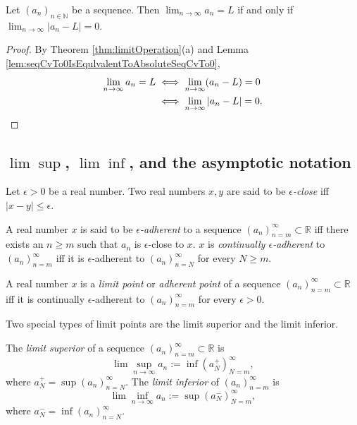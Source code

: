 \begin{coro}
  \label{coro:seqToLIsEquvalentToAbsOfSeqMinusLTo0}
  Let $(a_{n})_{n\in \mathbb{N}}$ be a sequence. Then
  $\lim_{n\rightarrow\infty}a_{n}=L$ if and only if
  $\lim_{n\rightarrow\infty}|a_{n}-L|=0$.
\end{coro}
\begin{proof}
  By Theorem \ref{thm:limitOperation}(a) and Lemma
  \ref{lem:seqCvTo0IsEqulvalentToAbsoluteSeqCvTo0},
  \begin{align*}
    \lim_{n\rightarrow\infty}a_{n}=L
    &\iff
      \lim_{n\rightarrow\infty}(a_{n}-L)=0\\
    &\iff
      \lim_{n\rightarrow\infty}|a_{n}-L|=0.\qedhere
  \end{align*}
\end{proof}

\subsection{$\lim\sup$, $\lim\inf$, and
  the asymptotic notation}
\label{sec:limSupLimInfAsympNotatation}


\begin{defn}
  Let $\epsilon>0$ be a real number.
  Two real numbers $x,y$ are said to be \emph{$\epsilon$-close}
  iff $|x-y|\le \epsilon$.
\end{defn}

\begin{defn}
  A real number $x$ is said to be \emph{$\epsilon$-adherent}
  to a sequence $(a_n)_{n=m}^{\infty}\subset \mathbb{R}$
  iff there exists an $n\ge m$ such that
  $a_n$ is $\epsilon$-close to $x$.
  $x$ is \emph{continually $\epsilon$-adherent} to
  $(a_n)_{n=m}^{\infty}$
  iff it is $\epsilon$-adherent to $(a_n)_{n=N}^{\infty}$
  for every $N\ge m$.
\end{defn}

\begin{defn}
  \label{def:limitPointInR}
  A real number $x$ is a \emph{limit point} or \emph{adherent point}
  of a sequence $(a_n)_{n=m}^{\infty}\subset \mathbb{R}$ 
  iff it is continually $\epsilon$-adherent to
  $(a_n)_{n=m}^{\infty}$ for every $\epsilon> 0$.
\end{defn}

\begin{rem}
  Two special types of limit points are the limit superior
  and the limit inferior.
\end{rem}

\begin{defn}
  \label{def:limSupLimInf}
  The \emph{limit superior} of a sequence
  $(a_n)_{n=m}^{\infty}\subset \mathbb{R}$ is
  \begin{equation}
    \label{eq:limsup}
    \lim \sup_{n\rightarrow \infty} a_n := \inf (a_N^+)_{N=m}^{\infty}, 
  \end{equation}
  where $a_N^+=\sup(a_n)_{n=N}^{\infty}$.
  The \emph{limit inferior} of $(a_n)_{n=m}^{\infty}$ is
  \begin{equation}
    \label{eq:liminf}
    \lim \inf_{n\rightarrow \infty} a_n := \sup (a_N^-)_{N=m}^{\infty}, 
  \end{equation}
  where $a_N^-=\inf(a_n)_{n=N}^{\infty}$.
\end{defn}


